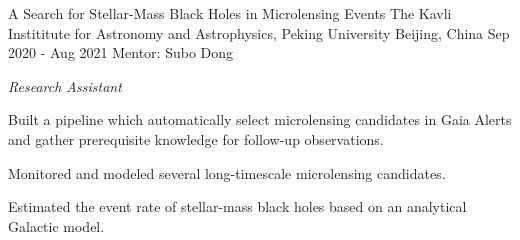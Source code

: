 \begin{cvexperiences}
\cvexperience
{A Search for Stellar-Mass Black Holes in Microlensing Events} %
{The Kavli Instititute for Astronomy and Astrophysics, Peking University} %
{Beijing, China} %
{Sep 2020 - Aug 2021} %
{Mentor: Subo Dong}
{ %
	\begin{cvitems}
		\item {\textit{Research Assistant}}
		\item {Built a pipeline which automatically select microlensing candidates in Gaia Alerts and gather prerequisite knowledge for follow-up observations.}
		\item {Monitored and modeled several long-timescale microlensing candidates.}
		\item {Estimated the event rate of stellar-mass black holes based on an analytical Galactic model.}
	\end{cvitems}
}

\end{cvexperiences}